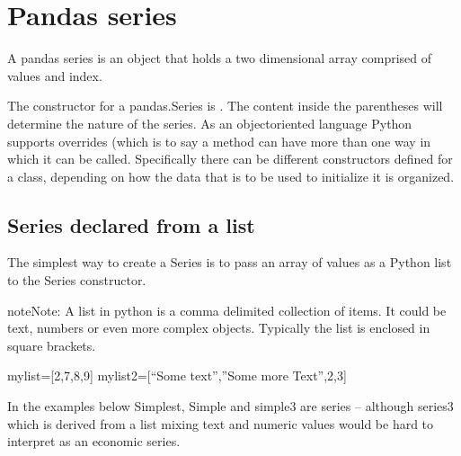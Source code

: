 \documentclass[letterpaper,10pt,english]{jupyterBook}
\begin{document}
\section{Pandas series}
\label{\detokenize{content/04_PythonEssentials/PythonPackagesEtc:pandas-series}}
\sphinxAtStartPar
A pandas series is an object that holds a two dimensional array comprised of values and index.

\sphinxAtStartPar
The constructor for a pandas.Series is .  The content inside the parentheses will determine the nature of the series.  As an object\sphinxhyphen{}oriented language Python supports overrides (which is to say a method can have more than one way in which it can be called. Specifically there can be different constructors defined for a class, depending on how the data that is to be used to initialize it is organized.


\subsection{Series declared from a list}
\label{\detokenize{content/04_PythonEssentials/PythonPackagesEtc:series-declared-from-a-list}}
\sphinxAtStartPar
The simplest way to create a Series is to pass an array of values as a Python list to the Series constructor.

\begin{sphinxadmonition}{note}{Note:}
\sphinxAtStartPar
A list in python is a comma delimited collection of items.  It could be text, numbers or even more complex objects.  Typically the list is enclosed in  square brackets.

\sphinxAtStartPar
mylist={[}2,7,8,9{]}
mylist2={[}“Some text”,”Some more Text”,2,3{]}
\end{sphinxadmonition}

\sphinxAtStartPar
In the examples below Simplest, Simple and simple3 are series – although series3 which is derived from a list mixing text and numeric values would be hard to interpret as an economic series.
\end{document}
